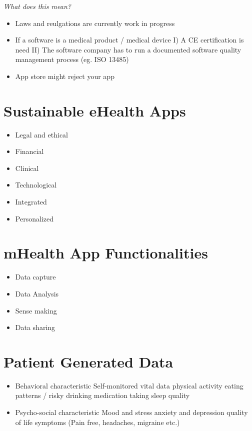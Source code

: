 \documentclass{report}
\theoremstyle{definition}
\theoremstyle{example}
\begin{document}
\textit{What does this mean?}
\begin{itemize}
   \item Laws and reulgations are currently work in progress
   \item If a software is a medical product / medical device
   \subitem I) A CE certification is need
   \subitem II) The software company has to run a documented software quality management process (eg. ISO 13485)
   \item App store might reject your app 
\end{itemize}


\section{Sustainable eHealth Apps}

\begin{itemize}
   \item Legal and ethical
   \item Financial
   \item Clinical
   \item Technological
   \item Integrated
   \item Personalized
\end{itemize}

\section{mHealth App Functionalities}
\begin{itemize}
   \item Data capture
   \item Data Analysis
   \item Sense making
   \item Data sharing
\end{itemize}

\section{Patient Generated Data}

\begin{itemize}
   \item Behavioral characteristic
   \subitem Self-monitored vital data
   \subitem physical activity
   \subitem eating patterns / risky drinking
   \subitem medication taking
   \subitem sleep quality
   \item Psycho-social characteristic
   \subitem Mood and stress
   \subitem anxiety and depression
   \subitem quality of life symptoms (Pain free, headaches, migraine etc.)
\end{itemize}
\end{document}

